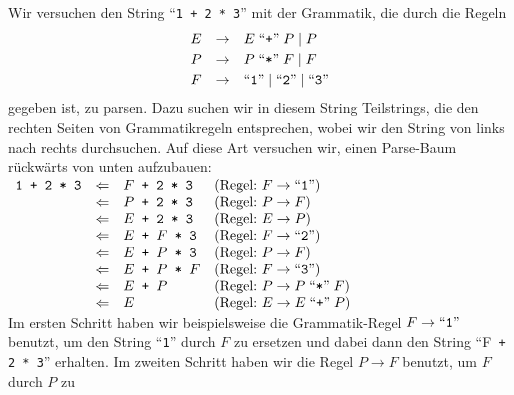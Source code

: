 Wir versuchen den String ``\texttt{1 + 2 * 3}'' mit der Grammatik, die durch die
Regeln 
\[ 
\begin{array}[t]{rcl}
  E & \rightarrow & E \;\mbox{``\texttt{+}''}\; P \;|\; P  \\[0.1cm]
  P & \rightarrow & P \;\mbox{``\texttt{*}''}\; F \;|\; F  \\[0.1cm]
  F & \rightarrow & \mbox{``\texttt{1}''} \;|\; \mbox{``\texttt{2}''} \;|\; \mbox{``\texttt{3}''} 
\end{array}
\]
gegeben ist,  zu parsen.  Dazu suchen wir in diesem String
Teilstrings, die den rechten Seiten von Grammatikregeln entsprechen, wobei wir den String
von links nach rechts durchsuchen.  Auf diese Art versuchen wir,
einen Parse-Baum r\"uckw\"arts von unten aufzubauen:
\\[0.2cm]
\hspace*{0.3cm} 
$
\begin{array}[t]{lcll}
\texttt{1 + 2 * 3} & \Leftarrow & F \texttt{ + 2 * 3} 
                                & (\mbox{Regel:\ }  F \rightarrow  \mbox{``\texttt{1}''}) \\
                   & \Leftarrow & P \texttt{ + 2 * 3} 
                                & (\mbox{Regel:\ } P \rightarrow F) \\
                   & \Leftarrow & E \texttt{ + 2 * 3} 
                                & (\mbox{Regel:\ }  E \rightarrow  P) \\
                   & \Leftarrow & E \texttt{ + } F \texttt{ * 3} 
                                & (\mbox{Regel:\ } F \rightarrow  \mbox{``\texttt{2}''}) \\
                   & \Leftarrow & E \texttt{ + } P \texttt{ * 3} 
                                & (\mbox{Regel:\ } P \rightarrow F) \\
                   & \Leftarrow & E \texttt{ + } P \texttt{ * } F 
                                & (\mbox{Regel:\ } F \rightarrow \mbox{``\texttt{3}''}) \\
                   & \Leftarrow & E \texttt{ + } P & (\mbox{Regel:\ } P \rightarrow P \;\mbox{``\texttt{*}''}\; F) \\
                   & \Leftarrow & E                & (\mbox{Regel:\ } E \rightarrow E \;\mbox{``\texttt{+}''}\; P) 
\end{array}
$
\\[0.2cm]
Im ersten Schritt haben wir beispielsweise die Grammatik-Regel $F \rightarrow \mbox{``\texttt{1}''}$
benutzt, um den String ``\texttt{1}'' durch $F$ zu ersetzen und dabei dann den String 
``F\texttt{ + 2 * 3}'' erhalten.  Im zweiten Schritt haben wir die Regel
$P \rightarrow F$ benutzt, um $F$ durch $P$ zu

